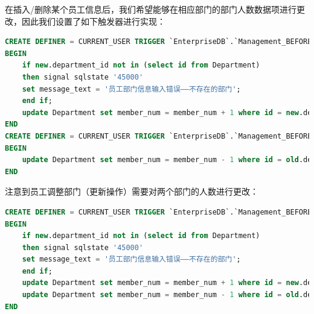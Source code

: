 \documentclass[withoutpreface,bwprint]{cumcmthesis} %
\begin{document}
在插入/删除某个员工信息后，我们希望能够在相应部门的部门人数数据项进行更改，因此我们设置了如下触发器进行实现：
\begin{lstlisting}[language=SQL]
CREATE DEFINER = CURRENT_USER TRIGGER `EnterpriseDB`.`Management_BEFORE_INSERT` BEFORE INSERT ON `Management` FOR EACH ROW
BEGIN
	if new.department_id not in (select id from Department)
	then signal sqlstate '45000'
    set message_text = '员工部门信息输入错误——不存在的部门';
	end if;
    update Department set member_num = member_num + 1 where id = new.department_id;
END
CREATE DEFINER = CURRENT_USER TRIGGER `EnterpriseDB`.`Management_BEFORE_DELETE` BEFORE DELETE ON `Management` FOR EACH ROW
BEGIN
	update Department set member_num = member_num - 1 where id = old.department_id;
END
\end{lstlisting}
注意到员工调整部门（更新操作）需要对两个部门的人数进行更改：
\begin{lstlisting}[language=SQL]
CREATE DEFINER = CURRENT_USER TRIGGER `EnterpriseDB`.`Management_BEFORE_UPDATE` BEFORE UPDATE ON `Management` FOR EACH ROW
BEGIN
	if new.department_id not in (select id from Department)
	then signal sqlstate '45000'
    set message_text = '员工部门信息输入错误——不存在的部门';
	end if;
    update Department set member_num = member_num + 1 where id = new.department_id;
	update Department set member_num = member_num - 1 where id = old.department_id;
END
\end{lstlisting}
\end{document}
